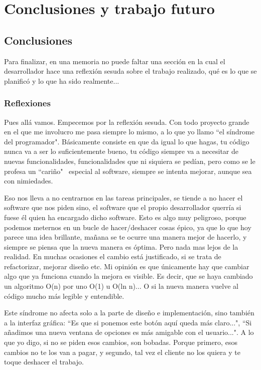 \chapter{Conclusiones y trabajo futuro}

\section{Conclusiones}
Para finalizar, en una memoria no puede faltar una secci\'on en la cual el 
desarrollador hace una reflexi\'on sesuda sobre el trabajo realizado, qu\'e es 
lo que se planific\'o y lo que ha sido realmente...

\subsection{Reflexiones}
Pues all\'a vamos. Empecemos por la reflexi\'on sesuda.
Con todo proyecto grande en el que me involucro me pasa siempre lo mismo, a lo 
que yo llamo ``el  s\'indrome del programador". B\'asicamente consiste en que 
da igual lo que hagas, tu c\'odigo nunca va a ser lo suficientemente bueno, tu 
c\'odigo siempre va a necesitar de nuevas funcionalidades, funcionalidades que 
ni siquiera se ped\'ian, pero como se le profesa un ``cari\~no" \ especial al 
software, siempre se intenta mejorar, aunque sea con nimiedades.

Eso nos lleva a no centrarnos en las tareas principales, se tiende a no hacer 
el software que nos piden sino, el software que el propio desarrollador 
querr\'ia si fuese \'el quien ha encargado dicho software. Esto es algo muy 
peligroso, porque podemos meternos en un bucle de hacer/deshacer cosas \'epico, 
ya que lo que hoy parece una idea brillante, ma\~nana se te ocurre una manera 
mejor de hacerlo, y siempre se piensa que la nueva manera es \'optima. Pero 
nada mas lejos de la realidad. En muchas ocasiones el cambio est\'a 
justificado, si se trata de refactorizar, mejorar dise\~no etc. Mi opini\'on es 
que \'unicamente hay que cambiar algo que ya funciona cuando la mejora es 
visible. Es decir, que se haya cambiado un algoritmo O(n) por uno O(1) u O(ln 
n)... O si la nueva manera vuelve al c\'odigo mucho m\'as legible y entendible.

Este s\'indrome no afecta solo a la parte de dise\~no e implementaci\'on, sino 
tambi\'en a la interfaz gr\'afica: ``Es que si ponemos este bot\'on aqu\'i 
queda m\'as claro...", ``Si a\~nadimos una nueva ventana de opciones es m\'as 
amigable con el usuario...". A lo que yo digo, si no se piden esos cambios, son 
bobadas. Porque primero, esos cambios no te los van a pagar, y segundo, tal vez 
el cliente no los quiera y te toque deshacer el trabajo.

